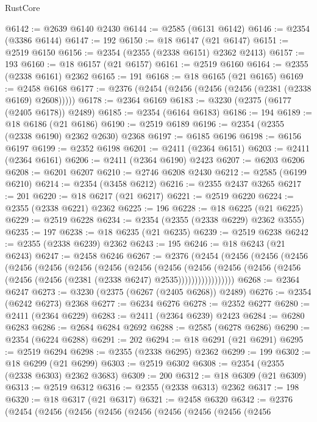 \begin{lexlean}{RustCore}
\begin{coremodule}
@6142 := @2639 @6140 @2430
@6144 := @2585 (@6131 @6142)
@6146 := @2354 (@3386 @6144)
@6147 := 192
@6150 := @18 @6147 (@21 @6147)
@6151 := @2519 @6150
@6156 := @2354 (@2355 (@2338 @6151) @2362 @2413)
@6157 := 193
@6160 := @18 @6157 (@21 @6157)
@6161 := @2519 @6160
@6164 := @2355 (@2338 @6161) @2362
@6165 := 191
@6168 := @18 @6165 (@21 @6165)
@6169 := @2458 @6168
@6177 := @2376 (@2454 (@2456 (@2456 (@2456 (@2381 (@2338 @6169) @2608)))))
@6178 := @2364 @6169
@6183 := @3230 (@2375 (@6177 (@2405 @6178)) @2489)
@6185 := @2354 (@6164 @6183)
@6186 := 194
@6189 := @18 @6186 (@21 @6186)
@6190 := @2519 @6189
@6196 := @2354 (@2355 (@2338 @6190) @2362 @2630) @2368
@6197 := @6185 @6196
@6198 := @6156 @6197
@6199 := @2352 @6198
@6201 := @2411 (@2364 @6151)
@6203 := @2411 (@2364 @6161)
@6206 := @2411 (@2364 @6190) @2423
@6207 := @6203 @6206
@6208 := @6201 @6207
@6210 := @2746 @6208 @2430
@6212 := @2585 (@6199 @6210)
@6214 := @2354 (@3458 @6212)
@6216 := @2355 @2437 @3265
@6217 := 201
@6220 := @18 @6217 (@21 @6217)
@6221 := @2519 @6220
@6224 := @2355 (@2338 @6221) @2362
@6225 := 196
@6228 := @18 @6225 (@21 @6225)
@6229 := @2519 @6228
@6234 := @2354 (@2355 (@2338 @6229) @2362 @3555)
@6235 := 197
@6238 := @18 @6235 (@21 @6235)
@6239 := @2519 @6238
@6242 := @2355 (@2338 @6239) @2362
@6243 := 195
@6246 := @18 @6243 (@21 @6243)
@6247 := @2458 @6246
@6267 := @2376
    (@2454
      (@2456
        (@2456
          (@2456
            (@2456
              (@2456
                (@2456
                  (@2456
                    (@2456
                      (@2456
                        (@2456
                          (@2456
                            (@2456 (@2456 (@2456 (@2456 (@2381 (@2338 @6247) @2535)))))))))))))))))
@6268 := @2364 @6247
@6273 := @3230 (@2375 (@6267 (@2405 @6268)) @2489)
@6276 := @2354 (@6242 @6273) @2368
@6277 := @6234 @6276
@6278 := @2352 @6277
@6280 := @2411 (@2364 @6229)
@6283 := @2411 (@2364 @6239) @2423
@6284 := @6280 @6283
@6286 := @2684 @6284 @2692
@6288 := @2585 (@6278 @6286)
@6290 := @2354 (@6224 @6288)
@6291 := 202
@6294 := @18 @6291 (@21 @6291)
@6295 := @2519 @6294
@6298 := @2355 (@2338 @6295) @2362
@6299 := 199
@6302 := @18 @6299 (@21 @6299)
@6303 := @2519 @6302
@6308 := @2354 (@2355 (@2338 @6303) @2362 @3683)
@6309 := 200
@6312 := @18 @6309 (@21 @6309)
@6313 := @2519 @6312
@6316 := @2355 (@2338 @6313) @2362
@6317 := 198
@6320 := @18 @6317 (@21 @6317)
@6321 := @2458 @6320
@6342 := @2376
    (@2454
      (@2456
        (@2456
          (@2456
            (@2456
              (@2456
                (@2456
                  (@2456
                    (@2456

\end{coremodule}
\end{lexlean}
